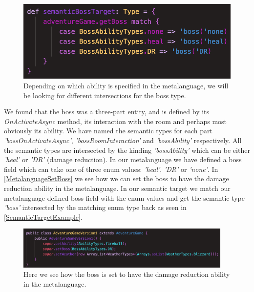 \begin{figure}
	\vspace{-10px}
	\includegraphics[width=\linewidth]{Materials/Decomposition/Boss/SemanticTarget}
	\caption{Depending on which ability is specified in the metalanguage, we will be looking for different intersections for the boss type.}
	\label{SemanticTargetExample}
\end{figure}
We found that the boss was a three-part entity, and is defined by its \textit{OnActivateAsync} method, its interaction with the room and perhaps most obviously its ability. We have named the semantic types for each part \textit{'bossOnActivateAsync'}, \textit{'bossRoomInteraction'} and \textit{'bossAbility'} respectively. All the semantic types are intersected by the kinding \textit{'bossAbility'} which can be either \textit{'heal'} or \textit{'DR'} (damage reduction). In our metalanguage we have defined a boss field which can take one of three enum values: \textit{'heal'}, \textit{'DR'} or \textit{'none'}. In \autoref{MetalanguageSetBoss} we see how we can set the boss to have the damage reduction ability in the metalanguage. In our semantic target we match our metalanguage defined boss field with the enum values and get the semantic type \textit{'boss'} intersected by the matching enum type back as seen in \autoref{SemanticTargetExample}.
\begin{figure}[H]
	\centering
	\includegraphics[width=0.95\textwidth]{Materials/Decomposition/Boss/MetalanguageSetBoss}
	\caption{Here we see how the boss is set to have the damage reduction ability in the metalanguage.}
	\label{MetalanguageSetBoss}
\end{figure}

